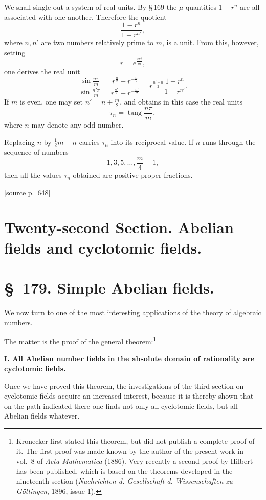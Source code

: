 \documentclass[11pt]{article}
\newcommand{\srcpage}[1]{\par\medskip\noindent\textsf{[source p.~#1]}\par\smallskip}
\begin{document}
We shall single out a system of real units. By \S\,169 the $\mu$ quantities $1-r^n$ are all associated with one another. Therefore the quotient
\[
\frac{1-r^n}{1-r^{n'}},
\]
where $n,n'$ are two numbers relatively prime to $m$, is a unit. From this, however, setting
\[
r=e^{\frac{2\pi i}{m}},
\]
one derives the real unit
\begin{equation}
\frac{\sin\frac{n\pi}{m}}{\sin\frac{n'\pi}{m}}
=\frac{r^{\frac n2}-r^{-\frac n2}}{r^{\frac{n'}2}-r^{-\frac{n'}2}}
=r^{\frac{n'-n}{2}}\frac{1-r^n}{1-r^{n'}}.
\tag{6}
\end{equation}
If $m$ is even, one may set $n'=n+\frac m2$, and obtains in this case the real units
\begin{equation}
\tau_n=\operatorname{tang}\frac{n\pi}{m},
\tag{7}
\end{equation}
where $n$ may denote any odd number.

Replacing $n$ by $\frac12m-n$ carries $\tau_n$ into its reciprocal value. If $n$ runs through the sequence of numbers
\[
1,3,5,\ldots,\frac m4-1,
\]
then all the values $\tau_n$ obtained are positive proper fractions.

\clearpage

\srcpage{648}
\section*{Twenty-second Section. Abelian fields and cyclotomic fields.}

\section*{\S~179. Simple Abelian fields.}

We now turn to one of the most interesting applications of the theory of algebraic numbers.

The matter is the proof of the general theorem:\footnote{Kronecker first stated this theorem, but did not publish a complete proof of it. The first proof was made known by the author of the present work in vol.~8 of \textit{Acta Mathematica} (1886). Very recently a second proof by Hilbert has been published, which is based on the theorems developed in the nineteenth section (\textit{Nachrichten d. Gesellschaft d. Wissenschaften zu Göttingen}, 1896, issue 1).}

\textbf{I. All Abelian number fields in the absolute domain of rationality are cyclotomic fields.}

Once we have proved this theorem, the investigations of the third section on cyclotomic fields acquire an increased interest, because it is thereby shown that on the path indicated there one finds not only all cyclotomic fields, but all Abelian fields whatever.
\end{document}

